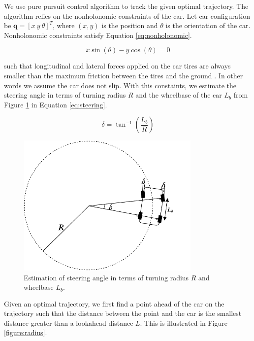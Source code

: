 We use pure pursuit control algorithm to track the given optimal trajectory.
The algorithm relies on the nonholonomic constraints of the car. Let car
configuration be $\textbf{q} = [x\ y\ \theta]^T$, where $(x, y)$ is the position
and $\theta$ is the orientation of the car. Nonholonomic constraints satisfy
Equation \eqref{eq:nonholonomic}.

\begin{equation}
  \dot{x}\sin(\theta) - \dot{y}\cos(\theta) = 0
  \label{eq:nonholonomic}
\end{equation}

such that longitudinal and lateral forces applied on the car tires are always
smaller than the maximum friction between the tires and the ground
\cite{Kim2013SensorbasedMP}.  In other words we assume the car does not slip.
With this constaints, we estimate the steering angle in terms of turning radius
$R$ and the wheelbase of the car $L_b$ from Figure \ref{figure:steering} in
Equation \eqref{eq:steering}.

\begin{equation}
  \delta = \tan^{-1}(\frac{L_b}{R})
  \label{eq:steering}
\end{equation}

\begin{figure}[h]
  \centering
  \includegraphics[width=0.8\textwidth]{figures/pure-pursuit-steering.pdf}
  \caption{Estimation of steering angle in terms of turning radius $R$ and
  wheelbase $L_b$.}
  \label{figure:steering}
\end{figure}

Given an optimal trajectory, we first find a point ahead of the car on the
trajectory such that the distance between the point and the car is the smallest
distance greater than a lookahead distance $L$. This is illustrated in Figure
\ref{figure:radius}.

